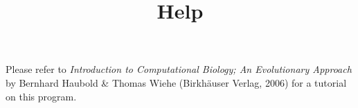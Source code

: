 \documentclass{article}
\begin{document}
\title{Help}
\maketitle

Please refer to {\it Introduction to Computational Biology; An
  Evolutionary Approach} by Bernhard Haubold \& Thomas Wiehe
  (Birkh\"auser Verlag, 2006) for a tutorial on this program.


%
%
\end{document}
